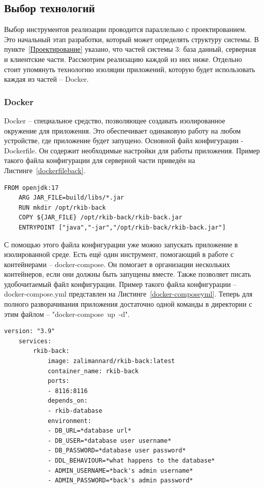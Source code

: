 \documentclass[a4paper,article]{article}
\begin{document}
    \subsection{Выбор технологий}\label{Реализация. Выбор}

    Выбор инструментов реализации проводится параллельно с проектированием. Это начальный этап разработки, который может определять структуру системы. В пункте~\ref{Проектирование} указано, что частей системы 3: база данный, серверная и клиентские части. Рассмотрим реализацию каждой из них ниже. Отдельно стоит упомянуть технологию изоляции приложений, которую будет использовать каждая из частей -- Docker.

    \subsubsection{Docker}\label{Реализация. Выбор. Докер}

    Docker -- специальное средство, позволяющее создавать изолированное окружение для приложения. Это обеспечивает одинаковую работу на любом устройстве, где приложение будет запущено. Основной файл конфигурации - Dockerfile. Он содержит необходимые настройки для работы приложения. Пример такого файла конфигурации для серверной части приведён на Листинге~\ref{dockerfileback}.

    \begin{lstlisting}[label=dockerfileback,caption=Пример Dockerfile для бекенда]
    FROM openjdk:17
    ARG JAR_FILE=build/libs/*.jar
    RUN mkdir /opt/rkib-back
    COPY ${JAR_FILE} /opt/rkib-back/rkib-back.jar
    ENTRYPOINT ["java","-jar","/opt/rkib-back/rkib-back.jar"]
    \end{lstlisting}

    С помощью этого файла конфигурации уже можно запускать приложение в изолированной среде. Есть ещё один инструмент, помогающий в работе с контейнерами -- docker-compose. Он помогает в организации нескольких контейнеров, если они должны быть запущены вместе. Также позволяет писать удобочитаемый файл конфигурации. Пример такого файла конфигурации -- docker-compose.yml представлен на Листинге~\ref{docker-composeyml}. Теперь для полного разворачивания приложения достаточно одной команды в директории с этим файлом -- "docker-compose~up~-d".

    \begin{lstlisting}[label=docker-composeyml,caption=Пример файла конфигурации docker-compose.yml]
    version: "3.9"
    services:
        rkib-back:
            image: zalimannard/rkib-back:latest
            container_name: rkib-back
            ports:
            - 8116:8116
            depends_on:
            - rkib-database
            environment:
            - DB_URL=*database url*
            - DB_USER=*database user username*
            - DB_PASSWORD=*database user password*
            - DDL_BEHAVIOUR=*what happens to the database*
            - ADMIN_USERNAME=*back's admin username*
            - ADMIN_PASSWORD=*back's admin password*
    \end{lstlisting}
\end{document}
